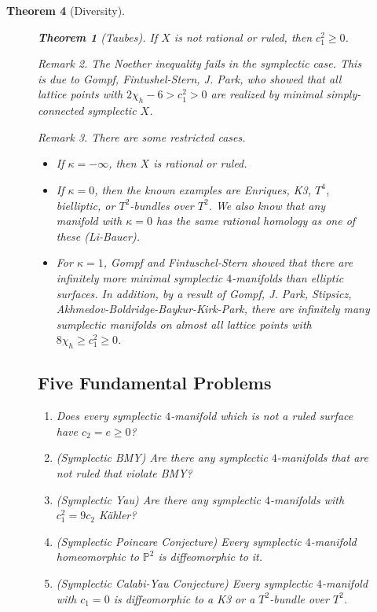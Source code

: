 \documentclass[leqno, openany]{memoir}
\newtheorem{thm}{Theorem}[chapter]
\theoremstyle{definition}
\theoremstyle{remark}
\newtheorem{rmk}[thm]{Remark}
\theoremstyle{plain}
\theoremstyle{definition}
\theoremstyle{remark}
\renewcommand{\P}{\mathbb{P}}
\begin{document}
\begin{thm}[Diversity]
\begin{figure}[H]
\begin{thm}[Taubes] If $X$ is not rational or ruled, then $c_1^2 \geq 0$.
\end{thm}

\begin{rmk} The Noether inequality fails in the symplectic case. This is due to
Gompf, Fintushel-Stern, J. Park, who showed that all lattice points with $2
\chi_h - 6 > c_1^2 > 0$ are realized by minimal simply-connected symplectic
$X$.  \end{rmk}

\begin{rmk} There are some restricted cases.  \begin{itemize} \item If $\kappa
    = - \infty$, then $X$ is rational or ruled.  \item If $\kappa = 0$, then
    the known examples are Enriques, K3, $T^4$, bielliptic, or $T^2$-bundles
    over $T^2$. We also know that any manifold with $\kappa = 0$ has the same
    rational homology as one of these (Li-Bauer).  \item For $\kappa = 1$,
    Gompf and Fintuschel-Stern showed that there are infinitely more minimal
    symplectic $4$-manifolds than elliptic surfaces. In addition, by a result
    of Gompf, J. Park, Stipsicz, Akhmedov-Boldridge-Baykur-Kirk-Park, there are
    infinitely many sumplectic manifolds on almost all lattice points with $8
    \chi_h \geq c_1^2 \geq 0$.  \end{itemize} \end{rmk}

\subsection{Five Fundamental Problems}%

\begin{enumerate} \item Does every symplectic $4$-manifold which is not a ruled
    surface have $c_2 = e \geq 0$?  \item (Symplectic BMY) Are there any
    symplectic $4$-manifolds that are not ruled that violate BMY?  \item
    (Symplectic Yau) Are there any symplectic $4$-manifolds with $c_1^2 = 9c_2$
    K\"ahler?  \item (Symplectic Poincare Conjecture) Every symplectic
    $4$-manifold homeomorphic to $\P^2$ is diffeomorphic to it.  \item
    (Symplectic Calabi-Yau Conjecture) Every symplectic $4$-manifold with $c_1
    = 0$ is diffeomorphic to a K3 or a $T^2$-bundle over $T^2$.
    \end{enumerate}


\end{figure}
\end{thm}
\end{document}
